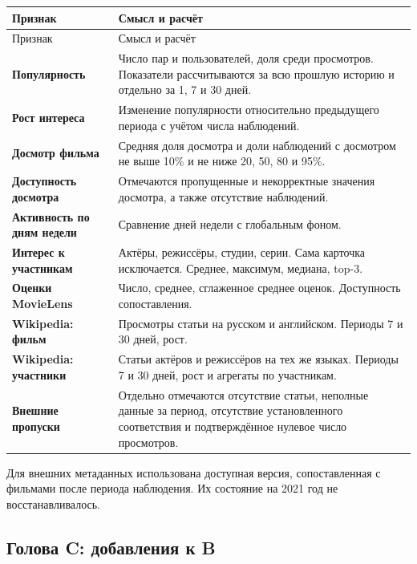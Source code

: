 \documentclass[11pt,a4paper]{article}
\begin{document}
\begin{longtable}{>{\raggedright\arraybackslash}p{4.1cm}>{\raggedright\arraybackslash}p{10.8cm}}
\toprule
Признак & Смысл и расчёт \\
\midrule
\endfirsthead
\toprule
Признак & Смысл и расчёт \\
\midrule
\endhead
\textbf{Популярность} & Число пар и пользователей, доля среди просмотров. Показатели рассчитываются за всю прошлую историю и отдельно за 1, 7 и 30 дней. \\[4pt]
\textbf{Рост интереса} & Изменение популярности относительно предыдущего периода с учётом числа наблюдений. \\[4pt]
\textbf{Досмотр фильма} & Средняя доля досмотра и доли наблюдений с досмотром не выше 10\% и не ниже 20, 50, 80 и 95\%. \\[4pt]
\textbf{Доступность досмотра} & Отмечаются пропущенные и некорректные значения досмотра, а также отсутствие наблюдений. \\[4pt]
\textbf{Активность по дням недели} & Сравнение дней недели с глобальным фоном. \\[4pt]
\textbf{Интерес к участникам} & Актёры, режиссёры, студии, серии. Сама карточка исключается. Среднее, максимум, медиана, top-3. \\[4pt]
\textbf{Оценки MovieLens} & Число, среднее, сглаженное среднее оценок. Доступность сопоставления. \\[4pt]
\textbf{Wikipedia: фильм} & Просмотры статьи на русском и английском. Периоды 7 и 30 дней, рост. \\[4pt]
\textbf{Wikipedia: участники} & Статьи актёров и режиссёров на тех же языках. Периоды 7 и 30 дней, рост и агрегаты по участникам. \\[4pt]
\textbf{Внешние пропуски} & Отдельно отмечаются отсутствие статьи, неполные данные за период, отсутствие установленного соответствия и подтверждённое нулевое число просмотров. \\[4pt]
\bottomrule
\end{longtable}

Для внешних метаданных использована доступная версия, сопоставленная с фильмами после периода наблюдения. Их состояние на 2021 год не восстанавливалось.

\newpage

\subsection{Голова C: добавления к B}
\end{document}
